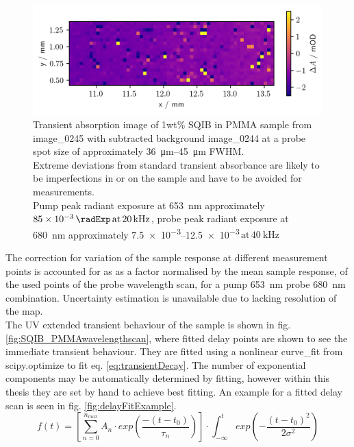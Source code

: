 \documentclass[twoside,openright]{scrreprt}
\def\pumpExp#1{\ensuremath{\SI{#1}{\radExp}\,\mathrm{at}\, \SI{20}{\kilo\hertz}}}
\def\frep#1{\ensuremath{\,\mathrm{at}\, \SI{#1}{\kilo\hertz}}}
\begin{document}
\begin{figure}[hbt]
\centering
\includegraphics[scale=1]{images/1percentSQIBinPMMA_Sample653-680Image.png}
\caption{Transient absorption image of 1wt\% SQIB in PMMA sample from image\_0245 with subtracted background image\_0244 at a probe spot size of approximately \SIrange{36}{45}{\micro\meter} FWHM.\\ Extreme deviations from standard transient absorbance are likely to be imperfections in or on the sample and have to be avoided for measurements.\\ Pump peak radiant exposure at \SI{653}{\nano\meter} approximately \pumpExp{85e-3}, probe peak radiant exposure at \SI{680}{\nano\meter} approximately \SIrange{7.5e-3}{12.5e-3}{\radExp}\frep{40} \label{fig:TA_image_sample}}
\end{figure}

The correction for variation of the sample response at different measurement points is accounted for as as a factor normalised by the mean sample response, of the used points of the probe wavelength scan, for a pump \SI{653}{\nano\meter} probe \SI{680}{\nano\meter} combination. Uncertainty estimation is unavailable due to lacking resolution of the map.\\
The UV extended transient behaviour of the sample is shown in fig. \ref{fig:SQIB_PMMAwavelengthscan}, where fitted delay points are shown to see the immediate transient behaviour. They are fitted using a nonlinear curve\_fit from scipy.optimize to fit eq. \ref{eq:transientDecay}. The number of exponential components may be automatically determined by fitting, however within this thesis they are set by hand to achieve best fitting. An example for a fitted delay scan is seen in fig. \ref{fig:delayFitExample}.
\begin{equation}\label{eq:transientDecay}
f(t) = \left[\sum_{n=0}^{n_{max}} A_n\cdot exp \left(\frac{-(t-t_0)}{\tau_n}\right)\right]\cdot \int_{-\infty}^t exp\left(-\frac{(t-t_0)^2}{2\sigma^2}\right)
\end{equation}
\end{document}
